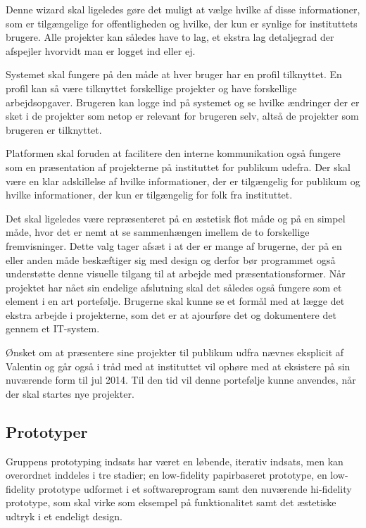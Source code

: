 Denne wizard skal ligeledes gøre det muligt at vælge hvilke af disse informationer, som er tilgængelige for offentligheden og hvilke, der kun er synlige for instituttets brugere. Alle projekter kan således have to lag, et ekstra lag detaljegrad der afspejler hvorvidt man er logget ind eller ej.

Systemet skal fungere på den måde at hver bruger har en profil tilknyttet. En profil kan så være tilknyttet forskellige projekter og have forskellige arbejdsopgaver. Brugeren kan logge ind på systemet og se hvilke ændringer der er sket i de projekter som netop er relevant for brugeren selv, altså de projekter som brugeren er tilknyttet.

Platformen skal foruden at facilitere den interne kommunikation også fungere som en præsentation af projekterne på instituttet for publikum udefra. Der skal være en klar adskillelse af hvilke informationer, der er tilgængelig for publikum og hvilke informationer, der kun er tilgængelig for folk fra instituttet. 

Det skal ligeledes være repræsenteret på en æstetisk flot måde og på en simpel måde, hvor det er nemt at se sammenhængen imellem de to forskellige fremvisninger. Dette valg tager afsæt i at der er mange af brugerne, der på en eller anden måde beskæftiger sig med design og derfor bør programmet også understøtte denne visuelle tilgang til at arbejde med præsentationsformer.
Når projektet har nået sin endelige afslutning skal det således også fungere som et element i en art portefølje. Brugerne skal kunne se et formål med at lægge det ekstra arbejde i projekterne, som det er at ajourføre det og dokumentere det gennem et IT-system.

Ønsket om at præsentere sine projekter til publikum udfra nævnes eksplicit af Valentin og går også i tråd med at instituttet vil ophøre med at eksistere på sin nuværende form til jul 2014. Til den tid vil denne portefølje kunne anvendes, når der skal startes nye projekter. 

\subsection{Prototyper}
Gruppens prototyping indsats har været en løbende, iterativ indsats, men kan overordnet inddeles i tre stadier; en low-fidelity papirbaseret prototype, en low-fidelity prototype udformet i et softwareprogram samt den nuværende hi-fidelity prototype, som skal virke som eksempel på funktionalitet samt det æstetiske udtryk i et endeligt design.

